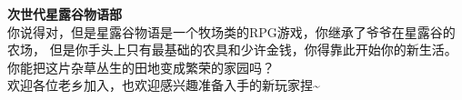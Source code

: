 \newline
\hfill
\vspace{2em}
\fontsize{23pt}{24pt}\selectfont
\textbf{\textcolor{truepurple}{次世代星露谷物语部}}\\
\vspace{0.2em}
\small
\chind 你说得对，但是星露谷物语是一个牧场类的RPG游戏，你继承了爷爷在星露谷的农场，
但是你手头上只有最基础的农具和少许金钱，你得靠此开始你的新生活。
你能把这片杂草丛生的田地变成繁荣的家园吗？\\
\chind 欢迎各位老乡加入，也欢迎感兴趣准备入手的新玩家捏\~{}
